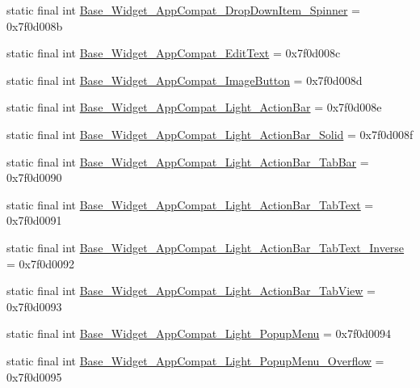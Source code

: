 \begin{DoxyCompactItemize}
static final int \mbox{\hyperlink{classcom_1_1google_1_1android_1_1gms_1_1R_1_1style_a9a7c308d789ede781e05df83c3f64eb0}{Base\+\_\+\+Widget\+\_\+\+App\+Compat\+\_\+\+Drop\+Down\+Item\+\_\+\+Spinner}} = 0x7f0d008b
\item 
static final int \mbox{\hyperlink{classcom_1_1google_1_1android_1_1gms_1_1R_1_1style_a77cd605f17cd797153c1be0a52dc4340}{Base\+\_\+\+Widget\+\_\+\+App\+Compat\+\_\+\+Edit\+Text}} = 0x7f0d008c
\item 
static final int \mbox{\hyperlink{classcom_1_1google_1_1android_1_1gms_1_1R_1_1style_a7f4551793b66774254de33992c6c6fa0}{Base\+\_\+\+Widget\+\_\+\+App\+Compat\+\_\+\+Image\+Button}} = 0x7f0d008d
\item 
static final int \mbox{\hyperlink{classcom_1_1google_1_1android_1_1gms_1_1R_1_1style_acc657934d200a1c804c8637f006e32a5}{Base\+\_\+\+Widget\+\_\+\+App\+Compat\+\_\+\+Light\+\_\+\+Action\+Bar}} = 0x7f0d008e
\item 
static final int \mbox{\hyperlink{classcom_1_1google_1_1android_1_1gms_1_1R_1_1style_a4e1016779d2f221189042d43494204f7}{Base\+\_\+\+Widget\+\_\+\+App\+Compat\+\_\+\+Light\+\_\+\+Action\+Bar\+\_\+\+Solid}} = 0x7f0d008f
\item 
static final int \mbox{\hyperlink{classcom_1_1google_1_1android_1_1gms_1_1R_1_1style_aadaf6bfa09e29b2d6993e4d8b2816d5a}{Base\+\_\+\+Widget\+\_\+\+App\+Compat\+\_\+\+Light\+\_\+\+Action\+Bar\+\_\+\+Tab\+Bar}} = 0x7f0d0090
\item 
static final int \mbox{\hyperlink{classcom_1_1google_1_1android_1_1gms_1_1R_1_1style_a772340f54fb4033fecbb622a1d128ea0}{Base\+\_\+\+Widget\+\_\+\+App\+Compat\+\_\+\+Light\+\_\+\+Action\+Bar\+\_\+\+Tab\+Text}} = 0x7f0d0091
\item 
static final int \mbox{\hyperlink{classcom_1_1google_1_1android_1_1gms_1_1R_1_1style_a21ebe2f0e76fb68432f14313d7a95613}{Base\+\_\+\+Widget\+\_\+\+App\+Compat\+\_\+\+Light\+\_\+\+Action\+Bar\+\_\+\+Tab\+Text\+\_\+\+Inverse}} = 0x7f0d0092
\item 
static final int \mbox{\hyperlink{classcom_1_1google_1_1android_1_1gms_1_1R_1_1style_a5b338e9204c974846eb29521090256ff}{Base\+\_\+\+Widget\+\_\+\+App\+Compat\+\_\+\+Light\+\_\+\+Action\+Bar\+\_\+\+Tab\+View}} = 0x7f0d0093
\item 
static final int \mbox{\hyperlink{classcom_1_1google_1_1android_1_1gms_1_1R_1_1style_a10846c8eb1f88a78761dbf35b3ae5f12}{Base\+\_\+\+Widget\+\_\+\+App\+Compat\+\_\+\+Light\+\_\+\+Popup\+Menu}} = 0x7f0d0094
\item 
static final int \mbox{\hyperlink{classcom_1_1google_1_1android_1_1gms_1_1R_1_1style_a6cf5e80c504b2ece64b98aab6c21d173}{Base\+\_\+\+Widget\+\_\+\+App\+Compat\+\_\+\+Light\+\_\+\+Popup\+Menu\+\_\+\+Overflow}} = 0x7f0d0095

\end{DoxyCompactItemize}
